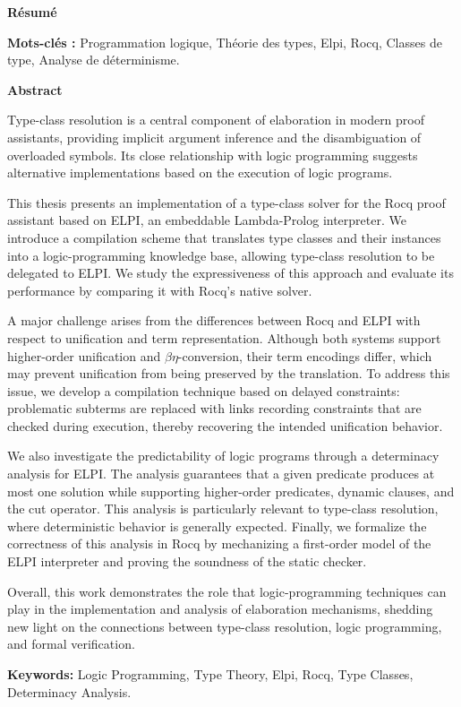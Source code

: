 \documentclass{these-ISSS}
\newcommand{\ind}{\phantom{iiii}}
\newcommand{\abstracT}{
  Type-class resolution is a central component of elaboration in modern proof
  assistants, providing implicit argument inference and the disambiguation of
  overloaded symbols. Its close relationship with logic programming suggests
  alternative implementations based on the execution of logic programs.

  \ind This thesis presents an implementation of a type-class solver for the Rocq proof
  assistant based on ELPI, an embeddable Lambda-Prolog interpreter. We introduce a
  compilation scheme that translates type classes and their instances into a
  logic-programming knowledge base, allowing type-class resolution to be delegated
  to ELPI. We study the expressiveness of this approach and evaluate its
  performance by comparing it with Rocq's native solver.

  \ind A major challenge arises from the differences between Rocq and ELPI with respect
  to unification and term representation. Although both systems support
  higher-order unification and $\beta\eta$-conversion, their term encodings
  differ, which may prevent unification from being preserved by the translation.
  To address this issue, we develop a compilation technique based on delayed
  constraints: problematic subterms are replaced with links recording constraints
  that are checked during execution, thereby recovering the intended unification
  behavior.

  \ind We also investigate the predictability of logic programs through a determinacy
  analysis for ELPI. The analysis guarantees that a given predicate produces at
  most one solution while supporting higher-order predicates, dynamic clauses, and
  the cut operator. This analysis is particularly relevant to type-class
  resolution, where deterministic behavior is generally expected. Finally, we
  formalize the correctness of this analysis in Rocq by mechanizing a first-order
  model of the ELPI interpreter and proving the soundness of the static checker.

  \ind Overall, this work demonstrates the role that logic-programming techniques can
  play in the implementation and analysis of elaboration mechanisms, shedding new
  light on the connections between type-class resolution, logic programming, and
  formal verification.
}
\begin{document}

  

  \maketitle


  \cleardoublepage

  \begin{center}\Large\bf \titreC \end{center}
  \begin{center}
    {\large\bfseries Résumé}\par\vspace{.1cm}
  \end{center}
  \resumeC

  \noindent\textbf{Mots-clés :} Programmation logique, Théorie des types, Elpi, Rocq, Classes de type, Analyse de déterminisme.

  \newpage
  \begin{center}\Large\bf \titleC \end{center}
  \begin{center}
    {\large\bfseries Abstract}\par\vspace{.1cm}
  \end{center}

  \begin{center}
  \begin{minipage}{0.9\textwidth}
    \abstracT
  \end{minipage}
  \end{center}

  \noindent\textbf{Keywords:} \foreignlanguage{english}{Logic Programming, Type Theory, Elpi, Rocq, Type Classes, Determinacy Analysis.}

  
  \tableofcontents

  \mainmatter
  \linenumbers

  
  
  
  
  
\end{document}
